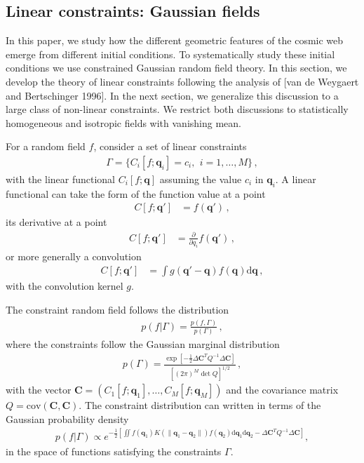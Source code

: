\documentclass[a4paper, 11pt]{article}
\begin{document}
\subsection{Linear constraints: Gaussian fields}
In this paper, we study how the different geometric features of the cosmic web emerge from different initial conditions. To systematically study these initial conditions we use constrained Gaussian random field theory. In this section, we develop the theory of linear constraints following the analysis of [van de Weygaert and Bertschinger 1996]. In the next section, we generalize this discussion to a large class of non-linear constraints. We restrict both discussions to statistically homogeneous and isotropic fields with vanishing mean.

For a random field $f$, consider a set of linear constraints
\begin{align}
\Gamma =\{ C_i[f;\bm{q}_i] = c_i,\,\ i=1,\dots,M \}\,,
\end{align}
with the linear functional $C_i[f;\bm{q}]$ assuming the value $c_i$ in $\bm{q}_i$. A linear functional can take the form of the function value at a point
\begin{align}
C[f;\bm{q}'] &= f(\bm{q}')\,,
\end{align}
its derivative at a point
\begin{align}
C[f;\bm{q}'] &= \frac{\partial}{\partial q_i}f(\bm{q}')\,,
\end{align}
or more generally a convolution
\begin{align}
C[f;\bm{q}'] &= \int g(\bm{q}' - \bm{q})f(\bm{q})\mathrm{d}\bm{q}\,,
\end{align}
with the convolution kernel $g$. 

The constraint random field follows the distribution
\begin{align}
p(f|\Gamma) = \frac{p(f,\Gamma)}{p(\Gamma)}\,,
\end{align}
where the constraints follow the Gaussian marginal distribution
\begin{align}
p(\Gamma) = \frac{\exp\left[-\frac{1}{2} \Delta\bm{C}^T Q^{-1} \Delta\bm{C} \right]}{[(2\pi)^M \det Q]^{1/2}}\,,
\end{align}
with the vector $\bm{C}=(C_1[f;\bm{q}_1], \dots, C_M[f;\bm{q}_M])$ and the covariance matrix $Q = \text{cov}(\bm{C}, \bm{C})$. The constraint distribution can written in terms of the Gaussian probability density
\begin{align}
p(f|\Gamma) \propto  e^{-\frac{1}{2} \left[\iint f(\bm{q}_1) K(\|\bm{q}_1 - \bm{q}_2\|) f(\bm{q}_2)\mathrm{d}\bm{q}_1 \mathrm{d}\bm{q}_2 -\Delta \bm{C}^TQ^{-1}\Delta \bm{C}\right]},\label{eq:constraint1}
\end{align}
in the space of functions satisfying the constraints $\Gamma$.
\end{document}
